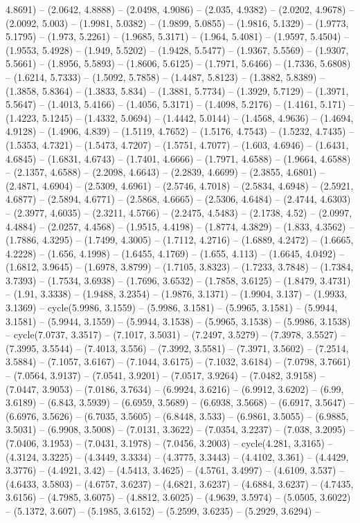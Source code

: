 4.8691) -- (2.0642, 4.8888) -- (2.0498, 4.9086) -- (2.035, 4.9382) -- (2.0202, 4.9678) -- (2.0092, 5.003) -- (1.9981, 5.0382) -- (1.9899, 5.0855) -- (1.9816, 5.1329) -- (1.9773, 5.1795) -- (1.973, 5.2261) -- (1.9685, 5.3171) -- (1.964, 5.4081) -- (1.9597, 5.4504) -- (1.9553, 5.4928) -- (1.949, 5.5202) -- (1.9428, 5.5477) -- (1.9367, 5.5569) -- (1.9307, 5.5661) -- (1.8956, 5.5893) -- (1.8606, 5.6125) -- (1.7971, 5.6466) -- (1.7336, 5.6808) -- (1.6214, 5.7333) -- (1.5092, 5.7858) -- (1.4487, 5.8123) -- (1.3882, 5.8389) -- (1.3858, 5.8364) -- (1.3833, 5.834) -- (1.3881, 5.7734) -- (1.3929, 5.7129) -- (1.3971, 5.5647) -- (1.4013, 5.4166) -- (1.4056, 5.3171) -- (1.4098, 5.2176) -- (1.4161, 5.171) -- (1.4223, 5.1245) -- (1.4332, 5.0694) -- (1.4442, 5.0144) -- (1.4568, 4.9636) -- (1.4694, 4.9128) -- (1.4906, 4.839) -- (1.5119, 4.7652) -- (1.5176, 4.7543) -- (1.5232, 4.7435) -- (1.5353, 4.7321) -- (1.5473, 4.7207) -- (1.5751, 4.7077) -- (1.603, 4.6946) -- (1.6431, 4.6845) -- (1.6831, 4.6743) -- (1.7401, 4.6666) -- (1.7971, 4.6588) -- (1.9664, 4.6588) -- (2.1357, 4.6588) -- (2.2098, 4.6643) -- (2.2839, 4.6699) -- (2.3855, 4.6801) -- (2.4871, 4.6904) -- (2.5309, 4.6961) -- (2.5746, 4.7018) -- (2.5834, 4.6948) -- (2.5921, 4.6877) -- (2.5894, 4.6771) -- (2.5868, 4.6665) -- (2.5306, 4.6484) -- (2.4744, 4.6303) -- (2.3977, 4.6035) -- (2.3211, 4.5766) -- (2.2475, 4.5483) -- (2.1738, 4.52) -- (2.0997, 4.4884) -- (2.0257, 4.4568) -- (1.9515, 4.4198) -- (1.8774, 4.3829) -- (1.833, 4.3562) -- (1.7886, 4.3295) -- (1.7499, 4.3005) -- (1.7112, 4.2716) -- (1.6889, 4.2472) -- (1.6665, 4.2228) -- (1.656, 4.1998) -- (1.6455, 4.1769) -- (1.655, 4.113) -- (1.6645, 4.0492) -- (1.6812, 3.9645) -- (1.6978, 3.8799) -- (1.7105, 3.8323) -- (1.7233, 3.7848) -- (1.7384, 3.7393) -- (1.7534, 3.6938) -- (1.7696, 3.6532) -- (1.7858, 3.6125) -- (1.8479, 3.4731) -- (1.91, 3.3338) -- (1.9488, 3.2354) -- (1.9876, 3.1371) -- (1.9904, 3.137) -- (1.9933, 3.1369) -- cycle(5.9986, 3.1559) -- (5.9986, 3.1581) -- (5.9965, 3.1581) -- (5.9944, 3.1581) -- (5.9944, 3.1559) -- (5.9944, 3.1538) -- (5.9965, 3.1538) -- (5.9986, 3.1538) -- cycle(7.0737, 3.3517) -- (7.1017, 3.5031) -- (7.2497, 3.5279) -- (7.3978, 3.5527) -- (7.3995, 3.5544) -- (7.4013, 3.556) -- (7.3992, 3.5581) -- (7.3971, 3.5602) -- (7.2514, 3.5884) -- (7.1057, 3.6167) -- (7.1044, 3.6175) -- (7.1032, 3.6184) -- (7.0798, 3.7661) -- (7.0564, 3.9137) -- (7.0541, 3.9201) -- (7.0517, 3.9264) -- (7.0482, 3.9158) -- (7.0447, 3.9053) -- (7.0186, 3.7634) -- (6.9924, 3.6216) -- (6.9912, 3.6202) -- (6.99, 3.6189) -- (6.843, 3.5939) -- (6.6959, 3.5689) -- (6.6938, 3.5668) -- (6.6917, 3.5647) -- (6.6976, 3.5626) -- (6.7035, 3.5605) -- (6.8448, 3.533) -- (6.9861, 3.5055) -- (6.9885, 3.5031) -- (6.9908, 3.5008) -- (7.0131, 3.3622) -- (7.0354, 3.2237) -- (7.038, 3.2095) -- (7.0406, 3.1953) -- (7.0431, 3.1978) -- (7.0456, 3.2003) -- cycle(4.281, 3.3165) -- (4.3124, 3.3225) -- (4.3449, 3.3334) -- (4.3775, 3.3443) -- (4.4102, 3.361) -- (4.4429, 3.3776) -- (4.4921, 3.42) -- (4.5413, 3.4625) -- (4.5761, 3.4997) -- (4.6109, 3.537) -- (4.6433, 3.5803) -- (4.6757, 3.6237) -- (4.6821, 3.6237) -- (4.6884, 3.6237) -- (4.7435, 3.6156) -- (4.7985, 3.6075) -- (4.8812, 3.6025) -- (4.9639, 3.5974) -- (5.0505, 3.6022) -- (5.1372, 3.607) -- (5.1985, 3.6152) -- (5.2599, 3.6235) -- (5.2929, 3.6294) -- 